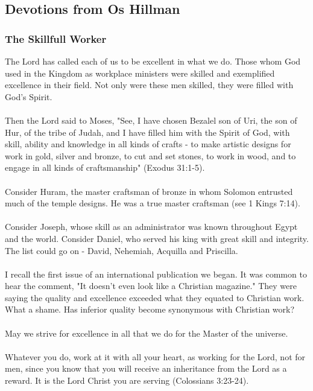 \subsection{Devotions from Os Hillman}

\subsubsection{The Skillfull Worker}



\noindent The Lord has called each of us to be excellent in what we do. Those whom God used in the Kingdom as workplace ministers were skilled and exemplified excellence in their field. Not only were these men skilled, they were filled with God's Spirit.\\
\\
\noindent Then the Lord said to Moses, "See, I have chosen Bezalel son of Uri, the son of Hur, of the tribe of Judah, and I have filled him with the Spirit of God, with skill, ability and knowledge in all kinds of crafts - to make artistic designs for work in gold, silver and bronze, to cut and set stones, to work in wood, and to engage in all kinds of craftsmanship" (Exodus 31:1-5).\\
\\
\noindent Consider Huram, the master craftsman of bronze in whom Solomon entrusted much of the temple designs. He was a true master craftsman (see 1 Kings 7:14).\\
\\
\noindent Consider Joseph, whose skill as an administrator was known throughout Egypt and the world. Consider Daniel, who served his king with great skill and integrity. The list could go on - David, Nehemiah, Acquilla and Priscilla.\\
\\
\noindent I recall the first issue of an international publication we began. It was common to hear the comment, "It doesn't even look like a Christian magazine." They were saying the quality and excellence exceeded what they equated to Christian work. What a shame. Has inferior quality become synonymous with Christian work?\\
\\
May we strive for excellence in all that we do for the Master of the universe.\\
\\
\noindent Whatever you do, work at it with all your heart, as working for the Lord, not for men, since you know that you will receive an inheritance from the Lord as a reward. It is the Lord Christ you are serving (Colossians 3:23-24).



